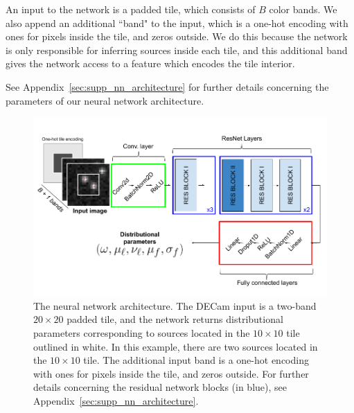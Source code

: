 An input to the network is a padded tile, which consists of $B$ color bands. 
We also append an additional ``band" to the input, which 
is a one-hot encoding with
ones for pixels inside the tile, and zeros outside. 
We do this because the network is only responsible for inferring sources inside each tile, and this additional band gives
the network access to a feature which encodes the tile interior. 

See Appendix~\ref{sec:supp_nn_architecture} for further details 
concerning the parameters of our neural network architecture. 



\begin{figure}[!tb]
    \centering
    \includegraphics[width=\textwidth]{figures_vg/starnet_archetecture9.png}
    \vspace{-1.cm}
    \caption{The neural network architecture. The DECam input is a two-band $20\times 20$ padded tile, 
    and the network returns distributional parameters corresponding to sources located in the $10\times 10$ tile outlined in white.
    In this example, there are two sources located in the $10\times10$ tile.
    The additional input band is a one-hot encoding with ones for pixels inside the tile, and zeros outside. 
    For further details concerning the residual network blocks (in blue), see 
    Appendix~\ref{sec:supp_nn_architecture}.
    }
    \label{fig:starnet_arch}
\end{figure}

